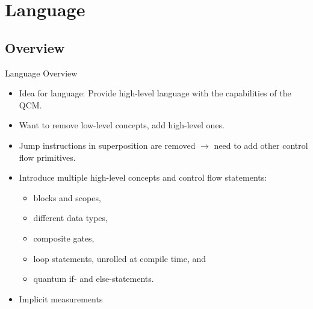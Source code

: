 \section{Language}
\subsection{Overview}
\begin{frame}{Language Overview}
    \begin{itemize}
        \item Idea for language: Provide high-level language with the capabilities of the QCM. 
        \item Want to remove low-level concepts, add high-level ones.
        \item Jump instructions in superposition are removed $\to$ need to add other control flow primitives.
        \item Introduce multiple high-level concepts and control flow statements:
        \begin{itemize}
            \item blocks and scopes,
            \item different data types,
            \item composite gates,
            \item loop statements, unrolled at compile time, and
            \item quantum if- and else-statements.
        \end{itemize}
        \item Implicit measurements
    \end{itemize}
\end{frame}

